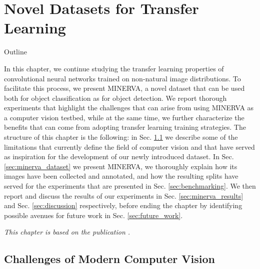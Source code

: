 \chapter{Novel Datasets for Transfer Learning}
\label{ch:minerva}

\begin{remark}{Outline}

	In this chapter, we continue studying the transfer learning properties of convolutional neural networks trained on non-natural image distributions. To facilitate this process, we present MINERVA, a novel dataset that can be used both for object classification as for object detection. We report thorough experiments that highlight the challenges that can arise from using MINERVA as a computer vision testbed, while at the same time, we further characterize the benefits that can come from adopting transfer learning training strategies. The structure of this chapter is the following: in Sec. \ref{sec:cv_challenges} we describe some of the limitations that currently define the field of computer vision and that have served as inspiration for the development of our newly introduced dataset. In Sec. \ref{sec:minerva_dataset} we present MINERVA, we thoroughly explain how its images have been collected and annotated, and how the resulting splits have served for the experiments that are presented in Sec. \ref{sec:benchmarking}. We then report and discuss the results of our experiments in Sec. \ref{sec:minerva_results} and Sec. \ref{sec:discussion} respectively, before ending the chapter by identifying possible avenues for future work in Sec. \ref{sec:future_work}. 

\vspace{5mm}
\textit{This chapter is based on the publication \citet{sabatelli2021advances}.}
\label{ch:minerva_paper}


\end{remark}


\section{Challenges of Modern Computer Vision}
\label{sec:cv_challenges}

